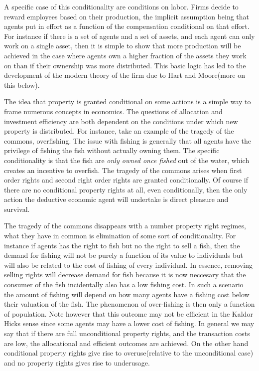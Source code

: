 \documentclass[12pt]{article}
\numberwithin{equation}{section}
\begin{document}
A specific case of this conditionality are conditions on labor. Firms decide to reward employees based on their production, the implicit assumption being that agents put in effort as a function of the compensation conditional on that effort. For instance if there is a set of agents and a set of assets, and each agent can only work on a single asset, then it is simple to show that more production will be achieved in the case where agents own a higher fraction of the assets they work on than if their ownership was more distributed. This basic logic has led to the development of the modern theory of the firm due to Hart and Moore(more on this below).

The idea that property is granted conditional on some actions is a simple way to frame numerous concepts in economics. The questions of allocation and investment efficiency are both dependent on the conditions under which new property is distributed. For instance, take an example of the tragedy of the commons, overfishing. The issue with fishing is generally that all agents have the privilege of fishing the fish without actually owning them. The specific conditionality is that the fish are \textit{only owned once fished} out of the water, which creates an incentive to overfish. The tragedy of the commons arises when first order rights and second right order rights are granted conditionally. Of course if there are no conditional property rights at all, even conditionally, then the only action the deductive economic agent will undertake is direct pleasure and survival.

The tragedy of the commons disappears with a number property right regimes, what they have in common is elimination of some sort of conditionality. For instance if agents has the right to fish but no the right to sell a fish, then the demand for fishing will not be purely a function of its value to individuals but will also be related to the cost of fishing of every individual. In essence, removing selling rights will decrease demand for fish because it is now neccesary that the consumer of the fish incidentally also has a low fishing cost. In such a scenario the amount of fishing will depend on how many agents have a fishing cost below their valuation of the fish. The phenomenon of over-fishing is then only a function of population. Note however that this outcome may not be efficient in the Kaldor Hicks sense since some agents may have a lower cost of fishing.  In general we may say that if there are full unconditional property rights, and the transaction costs are low, the allocational and efficient outcomes are achieved. On the other hand conditional property rights give rise to overuse(relative to the unconditional case) and no property rights gives rise to underusage.
\end{document}
